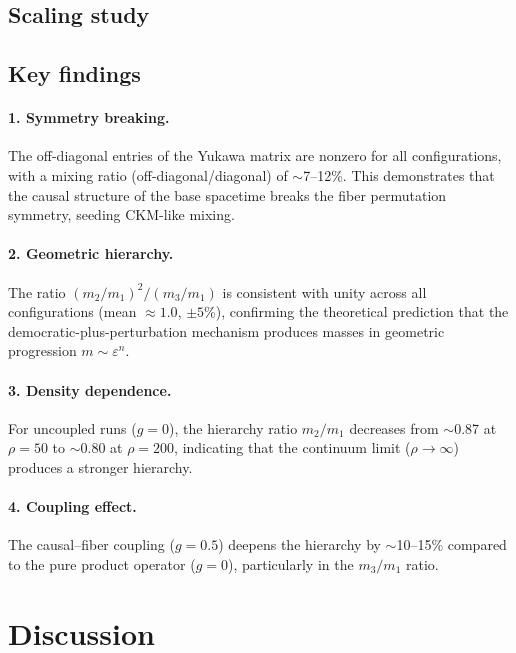\documentclass[12pt,a4paper]{article}
\begin{document}
\subsection{Scaling study}



\subsection{Key findings}

\paragraph{1. Symmetry breaking.}
The off-diagonal entries of the Yukawa matrix are nonzero for all
configurations, with a mixing ratio (off-diagonal/diagonal) of
$\sim$7--12\%.  This demonstrates that the causal structure of the
base spacetime breaks the fiber permutation symmetry, seeding CKM-like
mixing.

\paragraph{2. Geometric hierarchy.}
The ratio $(m_2/m_1)^2 / (m_3/m_1)$ is consistent with unity across
all configurations (mean $\approx 1.0$, $\pm 5$\%), confirming the
theoretical prediction that the democratic-plus-perturbation mechanism
produces masses in geometric progression $m \sim \varepsilon^n$.

\paragraph{3. Density dependence.}
For uncoupled runs ($g = 0$), the hierarchy ratio $m_2/m_1$ decreases
from $\sim$0.87 at $\rho = 50$ to $\sim$0.80 at $\rho = 200$,
indicating that the continuum limit ($\rho \to \infty$) produces a
stronger hierarchy.

\paragraph{4. Coupling effect.}
The causal--fiber coupling ($g = 0.5$) deepens the hierarchy by
$\sim$10--15\% compared to the pure product operator ($g = 0$),
particularly in the $m_3/m_1$ ratio.

\section{Discussion}
\end{document}
